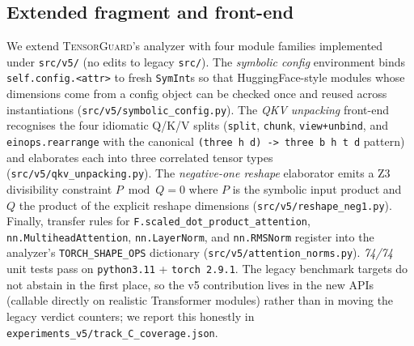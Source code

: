 \subsection{Extended fragment and front-end}\label{sec:impl-fragment}
We extend \textsc{TensorGuard}'s analyzer with four module families
implemented under \texttt{src/v5/} (no edits to legacy
\texttt{src/}). The \emph{symbolic config} environment binds
\texttt{self.config.<attr>} to fresh \texttt{SymInt}s so that
HuggingFace-style modules whose dimensions come from a config object
can be checked once and reused across instantiations
(\texttt{src/v5/symbolic\_config.py}). The \emph{QKV unpacking}
front-end recognises the four idiomatic Q/K/V splits
(\texttt{split}, \texttt{chunk}, \texttt{view+unbind}, and
\texttt{einops.rearrange} with the canonical
\verb|(three h d) -> three b h t d| pattern) and elaborates each
into three correlated tensor types
(\texttt{src/v5/qkv\_unpacking.py}). The \emph{negative-one
reshape} elaborator emits a Z3 divisibility constraint
$P \bmod Q = 0$ where $P$ is the symbolic input product and $Q$ the
product of the explicit reshape dimensions
(\texttt{src/v5/reshape\_neg1.py}). Finally, transfer rules for
\texttt{F.scaled\_dot\_product\_attention},
\texttt{nn.MultiheadAttention}, \texttt{nn.LayerNorm}, and
\texttt{nn.RMSNorm} register into the analyzer's
\texttt{TORCH\_SHAPE\_OPS} dictionary
(\texttt{src/v5/attention\_norms.py}). \emph{74/74}
unit tests pass on \texttt{python3.11} +
\texttt{torch~2.9.1}.
The legacy benchmark targets do not abstain in the first place,
so the v5 contribution lives in the new APIs (callable directly on
realistic Transformer modules) rather than in moving the legacy
verdict counters; we report this honestly in
\texttt{experiments\_v5/track\_C\_coverage.json}.

